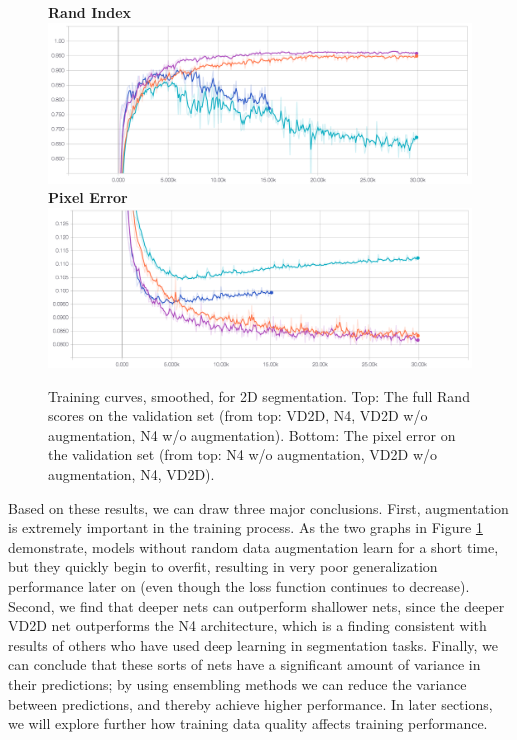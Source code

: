 \begin{figure}
\centering
\textbf{Rand Index}
\includegraphics[width=\textwidth]{img/2d_rand.png} \\
\textbf{Pixel Error}
\includegraphics[width=\textwidth]{img/2d_pixel.png}
\label{fig:2d_training_curves}
\caption[Training curves for 2D segmentation]{Training curves, smoothed, for 2D segmentation. Top: The full Rand scores on the validation set (from top: VD2D, N4, VD2D w/o augmentation, N4 w/o augmentation). Bottom: The pixel error on the validation set (from top: N4 w/o augmentation, VD2D w/o augmentation, N4, VD2D).}

\end{figure}

Based on these results, we can draw three major conclusions. First, augmentation is extremely important in the training process. As the two graphs in Figure \ref{fig:2d_training_curves} demonstrate, models without random data augmentation learn for a short time, but they quickly begin to overfit, resulting in very poor generalization performance later on (even though the loss function continues to decrease). Second, we find that deeper nets can outperform shallower nets, since the deeper VD2D net outperforms the N4 architecture, which is a finding consistent with results of others who have used deep learning in segmentation tasks. Finally, we can conclude that these sorts of nets have a significant amount of variance in their predictions; by using ensembling methods we can reduce the variance between predictions, and thereby achieve higher performance. In later sections, we will explore further how training data quality affects training performance.